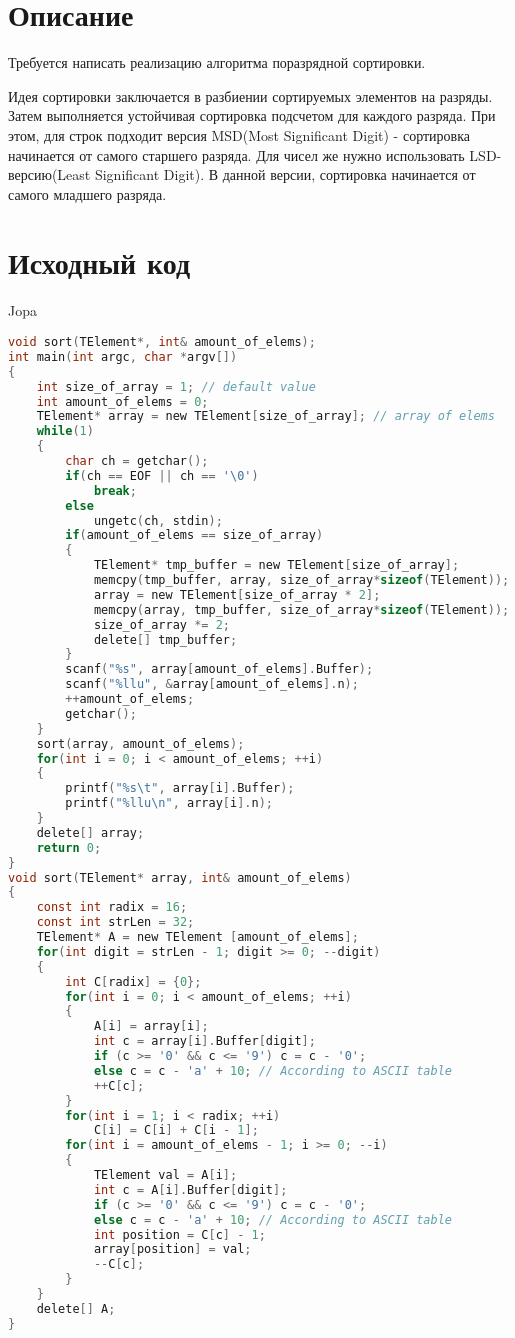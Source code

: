 \section{Описание}
Требуется написать реализацию алгоритма поразрядной сортировки.

Идея сортировки заключается в разбиении сортируемых элементов на разряды. Затем выполняется устойчивая сортировка подсчетом для каждого разряда. При этом, для строк подходит версия MSD(Most Significant Digit) - сортировка начинается от самого старшего разряда. Для чисел же нужно использовать LSD-версию(Least Significant Digit). В данной версии, сортировка начинается от самого младшего разряда.

\pagebreak

\section{Исходный код}
Jopa
\begin{lstlisting}[language=C]
void sort(TElement*, int& amount_of_elems);
int main(int argc, char *argv[])
{
    int size_of_array = 1; // default value
    int amount_of_elems = 0;
    TElement* array = new TElement[size_of_array]; // array of elems
    while(1)
    {
        char ch = getchar();
        if(ch == EOF || ch == '\0')
            break;
        else
            ungetc(ch, stdin);
        if(amount_of_elems == size_of_array)
        {
            TElement* tmp_buffer = new TElement[size_of_array];
            memcpy(tmp_buffer, array, size_of_array*sizeof(TElement));
            array = new TElement[size_of_array * 2];
            memcpy(array, tmp_buffer, size_of_array*sizeof(TElement));
            size_of_array *= 2;
            delete[] tmp_buffer;
        }
        scanf("%s", array[amount_of_elems].Buffer);
        scanf("%llu", &array[amount_of_elems].n);
        ++amount_of_elems;
        getchar();
    }
    sort(array, amount_of_elems);
    for(int i = 0; i < amount_of_elems; ++i)
    {
        printf("%s\t", array[i].Buffer);
        printf("%llu\n", array[i].n);
    }
    delete[] array;
    return 0;
}
void sort(TElement* array, int& amount_of_elems)
{
    const int radix = 16;
    const int strLen = 32;
    TElement* A = new TElement [amount_of_elems];
    for(int digit = strLen - 1; digit >= 0; --digit)
    {
        int C[radix] = {0};
        for(int i = 0; i < amount_of_elems; ++i)
        {
            A[i] = array[i];
            int c = array[i].Buffer[digit];
            if (c >= '0' && c <= '9') c = c - '0';
            else c = c - 'a' + 10; // According to ASCII table
            ++C[c];
        }
        for(int i = 1; i < radix; ++i)
            C[i] = C[i] + C[i - 1];
        for(int i = amount_of_elems - 1; i >= 0; --i)
        {
            TElement val = A[i];
            int c = A[i].Buffer[digit];
            if (c >= '0' && c <= '9') c = c - '0';
            else c = c - 'a' + 10; // According to ASCII table
            int position = C[c] - 1;
            array[position] = val;
            --C[c];
        }
    }
    delete[] A;
}

	
\end{lstlisting}


